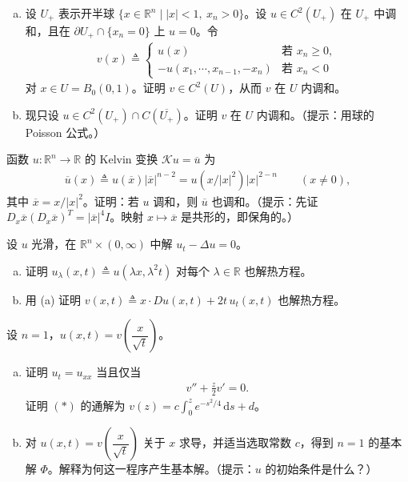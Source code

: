 \documentclass[../../main.tex]{subfiles}
\begin{document}
\begin{exercise}[反射原理]\label{exercise:ch02-10}
\begin{enumerate}[(a)]
\item 设 $U_+$ 表示开半球 $\{x\in\mathbb{R}^n\mid |x|<1,\ x_n>0\}$。设 $u\in C^2(U_+)$ 在 $U_+$ 中调和，且在 $\partial U_+\cap\{x_n=0\}$ 上 $u=0$。令
\begin{align*}
v(x)\triangleq\begin{cases}
u(x) & \text{若 }x_n\geqslant 0,\\
-u(x_1,\cdots,x_{n-1},-x_n) & \text{若 }x_n<0
\end{cases}
\end{align*}
对 $x\in U=B_0(0,1)$。证明 $v\in C^2(U)$，从而 $v$ 在 $U$ 内调和。
\item 现只设 $u\in C^2(U_+)\cap C(\overline{U_+})$。证明 $v$ 在 $U$ 内调和。（提示：用球的 Poisson 公式。）
\end{enumerate}
\end{exercise}

\begin{exercise}\label{exercise:ch02-11}函数 $u:\mathbb{R}^n\to\mathbb{R}$ 的 Kelvin 变换 $\mathcal{K}u=\overline{u}$ 为
\begin{align*}
\overline{u}(x)\triangleq u(\overline{x})|\overline{x}|^{n-2}=u(x/|x|^2)|x|^{2-n} \qquad (x\neq 0),
\end{align*}
其中 $\overline{x}=x/|x|^2$。证明：若 $u$ 调和，则 $\overline{u}$ 也调和。（提示：先证 $D_x\overline{x}(D_x\overline{x})^T=|\overline{x}|^4 I$。映射 $x\mapsto\overline{x}$ 是共形的，即保角的。）
\end{exercise}

\begin{exercise}\label{exercise:ch02-12}
设 $u$ 光滑，在 $\mathbb{R}^n\times(0,\infty)$ 中解 $u_t-\Delta u=0$。
\begin{enumerate}[(a)]
\item 证明 $u_\lambda(x,t)\triangleq u(\lambda x,\lambda^2 t)$ 对每个 $\lambda\in\mathbb{R}$ 也解热方程。
\item 用 (a) 证明 $v(x,t)\triangleq x\cdot Du(x,t)+2t\,u_t(x,t)$ 也解热方程。
\end{enumerate}
\end{exercise}

\begin{exercise}\label{exercise:ch02-13}
设 $n=1$，$u(x,t)=v\!\left(\dfrac{x}{\sqrt{t}}\right)$。
\begin{enumerate}[(a)]
\item 证明 $u_t=u_{xx}$ 当且仅当
\begin{align*}
v''+\frac{z}{2}v'=0. 
\end{align*}
证明 $(*)$ 的通解为 $v(z)=c\displaystyle\int_0^z e^{-s^2/4}\,\mathrm{d}s+d$。
\item 对 $u(x,t)=v\!\left(\dfrac{x}{\sqrt{t}}\right)$ 关于 $x$ 求导，并适当选取常数 $c$，得到 $n=1$ 的基本解 $\Phi$。解释为何这一程序产生基本解。（提示：$u$ 的初始条件是什么？）
\end{enumerate}
\end{exercise}
\end{document}
